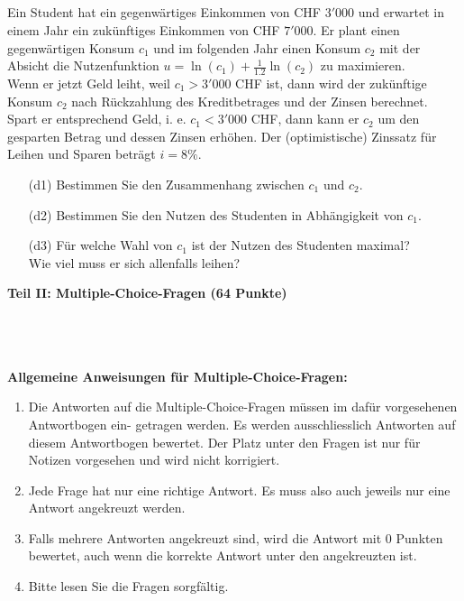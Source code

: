 \subsection*{}
Ein Student hat ein gegenwärtiges Einkommen von CHF $ 3'000 $ und erwartet in einem Jahr ein zukünftiges Einkommen von CHF $ 7'000 $. Er plant einen gegenwärtigen Konsum $ c_1 $ und im
folgenden Jahr einen Konsum $ c_2 $ mit der Absicht die Nutzenfunktion $ u = \ln(c_1) + \frac{1}{1.2}
\ln(c_2) $ zu maximieren.\\
Wenn er jetzt Geld leiht, weil $ c_1 > 3'000 $ CHF ist, dann wird der zukünftige Konsum $ c_2 $ nach
Rückzahlung des Kreditbetrages und der Zinsen berechnet. Spart er entsprechend Geld, i. e.
$ c_1 < 3'000 $ CHF, dann kann er $ c_2 $ um den gesparten Betrag und dessen Zinsen erhöhen. Der (optimistische)
Zinssatz für Leihen und Sparen beträgt $ i = 8\% $.
\begin{enumerate}
	\item[(d1)] Bestimmen Sie den Zusammenhang zwischen $ c_1 $ und $ c_2 $.
	\item[(d2)] Bestimmen Sie den Nutzen des Studenten in Abhängigkeit von $ c_1 $.
	\item[(d3)] Für welche Wahl von $ c_1 $ ist der Nutzen des Studenten maximal?\\
	Wie viel muss er sich allenfalls leihen? 
\end{enumerate}
\newpage
{}
\begin{Large}
\textbf{Teil II: Multiple-Choice-Fragen (64 Punkte)}
\end{Large}
\\
\\
\\
\textbf{Allgemeine Anweisungen für Multiple-Choice-Fragen:}
\\
\renewcommand{\labelenumi}{(\roman{enumi})}
\begin{enumerate}
\item
Die Antworten auf die Multiple-Choice-Fragen müssen im dafür vorgesehenen Antwortbogen ein-
getragen werden. Es werden ausschliesslich Antworten auf diesem Antwortbogen bewertet. Der
Platz unter den Fragen ist nur für Notizen vorgesehen und wird nicht korrigiert.

\item
Jede Frage hat nur eine richtige Antwort. Es muss also auch jeweils nur eine Antwort angekreuzt
werden.

\item
Falls mehrere Antworten angekreuzt sind, wird die Antwort mit 0 Punkten bewertet, auch wenn
die korrekte Antwort unter den angekreuzten ist.

\item
Bitte lesen Sie die Fragen sorgfältig.

\end{enumerate}
\newpage
